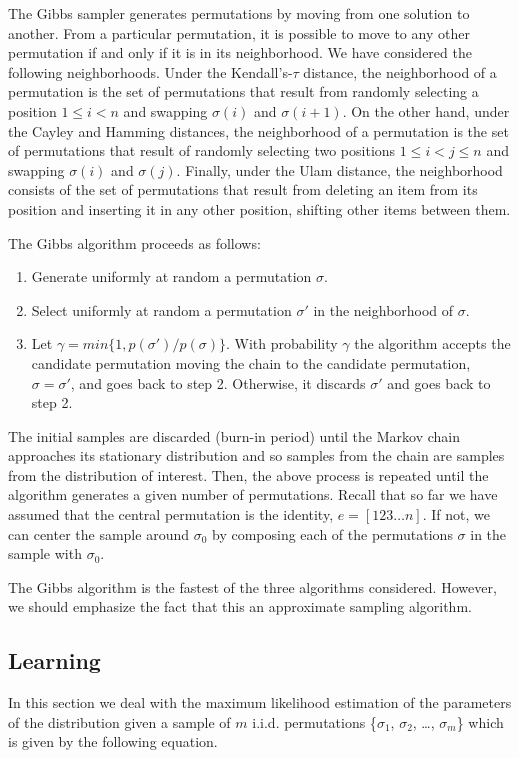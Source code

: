 \documentclass[article,nojss]{jss}
\begin{document}
The Gibbs sampler generates permutations by moving from one solution to another. From a particular permutation, it is possible to move to any other permutation if  and only if it is in its neighborhood. We have considered the following neighborhoods. Under the Kendall's-$\tau$ distance, the neighborhood of a permutation is the set of permutations that result from randomly selecting a position $1\leq i < n$ and swapping $\sigma(i)$ and $\sigma(i+1)$. On the other hand, under the Cayley and Hamming distances, the neighborhood of a permutation is the set of permutations that result of randomly selecting two positions $1\leq i< j\leq n$ and swapping $\sigma(i)$ and $\sigma(j)$. Finally, under the Ulam distance, the neighborhood consists of the set of permutations that result from deleting an item from its position and inserting it in any other position, shifting other items between them. 

The Gibbs algorithm proceeds as follows: 
\begin{enumerate}
 \item Generate uniformly at random  a permutation $\sigma$. 
 \item Select uniformly at random a permutation $\sigma'$ in the neighborhood of $\sigma$.
 \item Let $\gamma = min\{1,p(\sigma') / p(\sigma)\}$. With probability   $\gamma$ the algorithm accepts the candidate permutation moving the chain to the candidate permutation, $\sigma=\sigma'$, and goes back to step 2. Otherwise, it discards $\sigma'$ and goes back to step 2. 
\end{enumerate}

The initial samples are discarded (burn-in period) until the  Markov chain  approaches its stationary distribution and so samples from the chain are samples from the distribution of interest. Then, the above process is repeated until the algorithm generates a given number of permutations. Recall that so far we have assumed that the central permutation is the identity, $e=[123\ldots n]$. If not, we can center the sample around $\sigma_0$ by composing each of the permutations $\sigma$ in the sample with $\sigma_0$.

The Gibbs algorithm is the fastest of the three algorithms considered. However, we should emphasize the fact that this an approximate sampling algorithm.

\subsection{Learning}%
\label{sec:learning}
In this section we deal with the maximum likelihood estimation of the parameters of the distribution given a sample of $m$ i.i.d. permutations \{$\sigma_1$, $\sigma_2$, \ldots , $\sigma_m$\} which is given by the following equation. 
 
\end{document}
